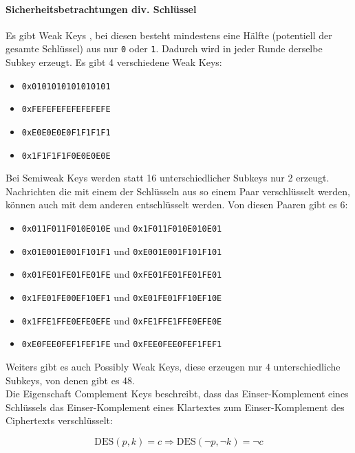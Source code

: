 \paragraph{Sicherheitsbetrachtungen div. Schlüssel}

Es gibt Weak Keys , bei diesen besteht mindestens eine Hälfte (potentiell der gesamte Schlüssel) aus nur \verb|0| oder \verb|1|. Dadurch wird in jeder 
Runde derselbe Subkey erzeugt. Es gibt 4 verschiedene Weak Keys:

\begin{itemize}
    \item \verb|0x0101010101010101|
    \item \verb|0xFEFEFEFEFEFEFEFE|
    \item \verb|0xE0E0E0E0F1F1F1F1|
    \item \verb|0x1F1F1F1F0E0E0E0E|
\end{itemize}

Bei Semiweak Keys  werden statt 16 unterschiedlicher Subkeys nur 2 erzeugt. Nachrichten die mit einem der Schlüsseln aus so einem Paar verschlüsselt 
werden, können auch mit dem anderen entschlüsselt werden. Von diesen Paaren gibt es 6:

\begin{itemize}
    \item \verb|0x011F011F010E010E| und \verb|0x1F011F010E010E01|
    \item \verb|0x01E001E001F101F1| und \verb|0xE001E001F101F101|
    \item \verb|0x01FE01FE01FE01FE| und \verb|0xFE01FE01FE01FE01|
    \item \verb|0x1FE01FE00EF10EF1| und \verb|0xE01FE01FF10EF10E|
    \item \verb|0x1FFE1FFE0EFE0EFE| und \verb|0xFE1FFE1FFE0EFE0E|
    \item \verb|0xE0FEE0FEF1FEF1FE| und \verb|0xFEE0FEE0FEF1FEF1|
\end{itemize}

Weiters gibt es auch Possibly Weak Keys, diese erzeugen nur 4 unterschiedliche Subkeys, von denen gibt es 48.\\

Die Eigenschaft Complement Keys  beschreibt, dass das Einser-Komplement eines Schlüssels das Einser-Komplement eines Klartextes zum 
Einser-Komplement des Ciphertexts verschlüsselt: 

$$\text{DES}(p, k) = c \Rightarrow \text{DES}(\lnot p, \lnot k) = \lnot c$$


